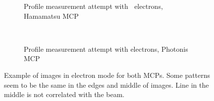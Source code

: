 \begin{figure}[!ht]
	\begin{subfigure}{0.5\textwidth}
		
		\caption{Profile measurement attempt with $\ $ electrons, Hamamatsu MCP}
		\label{}
	\end{subfigure}
	~
	\begin{subfigure}{0.5\textwidth}
		
		\caption{Profile measurement attempt with electrons, Photonis MCP}
		\label{}
	\end{subfigure}
	\caption[Example of images in electron mode]{Example of images in electron mode for both MCPs.
  Some patterns seem to be the same in the edges and middle of images.
  Line in the middle is not correlated with the beam.}
	\label{chap4:electron_MCP}
\end{figure}